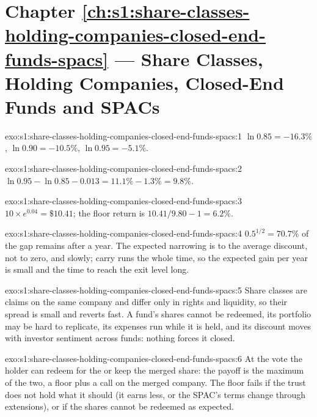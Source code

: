\section*{Chapter \ref{ch:s1:share-classes-holding-companies-closed-end-funds-spacs} --- Share Classes, Holding Companies, Closed-End Funds and SPACs}

\begin{solution}{exo:s1:share-classes-holding-companies-closed-end-funds-spacs:1}
$\ln 0.85 = -16.3\%$, $\ln 0.90 = -10.5\%$, $\ln 0.95 = -5.1\%$.
\end{solution}

\begin{solution}{exo:s1:share-classes-holding-companies-closed-end-funds-spacs:2}
$\ln 0.95 - \ln 0.85 - 0.013 = 11.1\% - 1.3\% = 9.8\%$.
\end{solution}

\begin{solution}{exo:s1:share-classes-holding-companies-closed-end-funds-spacs:3}
$10 \times e^{0.04} = \$10.41$; the floor return is $10.41/9.80 - 1 = 6.2\%$.
\end{solution}

\begin{solution}{exo:s1:share-classes-holding-companies-closed-end-funds-spacs:4}
$0.5^{1/2} = 70.7\%$ of the gap remains after a year. The expected narrowing is to the average discount, not to zero, and slowly; carry runs the whole time,
so the expected gain per year is small and the time to reach the exit level long.
\end{solution}

\begin{solution}{exo:s1:share-classes-holding-companies-closed-end-funds-spacs:5}
Share classes are claims on the same company and differ only in rights and liquidity, so their spread is small and reverts fast. A fund's shares cannot be
redeemed, its portfolio may be hard to replicate, its expenses run while it is held, and its discount moves with investor sentiment across funds: nothing
forces it closed.
\end{solution}

\begin{solution}{exo:s1:share-classes-holding-companies-closed-end-funds-spacs:6}
At the vote the holder can redeem for the  or keep the merged share: the payoff is the maximum of the two, a floor plus a call on the merged
company. The floor fails if the trust does not hold what it should (it earns less, or the SPAC's terms change through extensions), or if the shares cannot
be redeemed as expected.
\end{solution}

